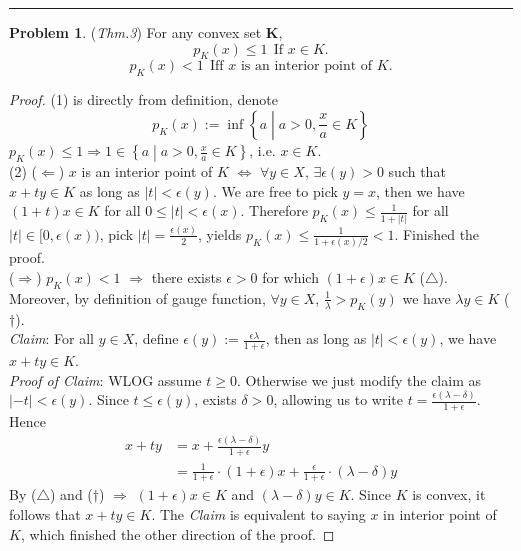 \documentclass[a4paper, 10pt]{article}
\theoremstyle{definition}
\newtheorem{problem}{Problem}
\theoremstyle{hSol}
\begin{document}
\noindent\rule{16cm}{0.4pt}
\begin{problem} (\textit{Thm.3}) For any convex set $\bm{K}$,
$$p_K(x)\leq 1~~\text{If $x\in K$.}$$
$$p_K(x)<1~~\text{Iff $x$ is an interior point of $K$.}$$
\end{problem}
\begin{proof} (1) is directly from definition, denote 
$$p_K(x):=\inf\left\{a\middle|a>0, \frac{x}{a}\in K\right\}$$
$p_K(x)\leq 1 \Rightarrow 1 \in \left\{a\middle|a>0, \frac{x}{a}\in K\right\}$, i.e. $x\in K$.\\
(2) ($\Leftarrow$) $x$ is an interior point of $K$ $\iff$ $\forall y\in X$, $\exists \epsilon(y)>0$ such that $x+ty\in K$ as long as $|t|<\epsilon(y)$. We are free to pick $y=x$, then we have $(1+t)x\in K$ for all $0\leq |t|<\epsilon(x)$. Therefore $p_K(x)\leq \frac{1}{1+|t|}$ for all $|t|\in [0,\epsilon(x))$, pick $|t|=\frac{\epsilon(x)}{2}$, yields $p_K(x)\leq \frac{1}{1+\epsilon(x)/2}<1$. Finished the proof. \\
($\Rightarrow$) $p_K(x)<1$ $\Rightarrow$ there exists $\epsilon>0$ for which $(1+\epsilon)x \in K$ ($\triangle$). \\
Moreover, by definition of gauge function, $\forall y\in X$, $\frac{1}{\lambda} > p_K(y)$ we have $\lambda y \in K$ ($\dag$).\\
\textit{Claim}: For all $y\in X$, define $\epsilon(y):=\frac{\epsilon \lambda}{1+\epsilon}$, then as long as $|t|<\epsilon(y)$, we have $x+ty \in K$.\\
\textit{Proof of Claim}: WLOG assume $t\geq 0$. Otherwise we just modify the claim as $|-t|<\epsilon(y)$. Since $t\leq \epsilon(y)$, exists $\delta>0$, allowing us to write $t=\frac{\epsilon(\lambda - \delta)}{1+\epsilon}$. Hence
\begin{equation}
  \begin{split}
    x+ty &= x+\frac{\epsilon(\lambda - \delta)}{1+\epsilon}y \\
    &= \frac{1}{1+\epsilon} \cdot(1+\epsilon)x + \frac{\epsilon}{1+\epsilon} \cdot(\lambda - \delta) y
  \end{split}
\end{equation}
By ($\triangle$) and ($\dag$) $\Rightarrow$ $(1+\epsilon)x \in K$ and $(\lambda - \delta) y\in K$. Since $K$ is convex, it follows that $x+ty \in K$. The \textit{Claim} is equivalent to saying $x$ in interior point of $K$, which finished the other direction of the proof.

\end{proof} 
\end{document}
